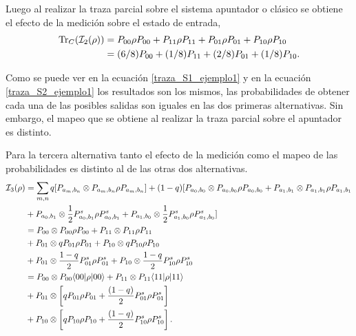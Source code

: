 Luego al realizar la traza parcial sobre el sistema apuntador  o clásico se obtiene el efecto de la medición sobre el estado de entrada,
\begin{equation}\label{traza_A2_ejemplo1}
    \begin{split}
        {\rm Tr}_C(\mathcal{I}_2(\rho)) &= P_{00} \rho P_{00} + P_{11}\rho P_{11}+ P_{01}\rho P_{01}+ P_{10}\rho P_{10}\\
        &=(6/8)P_{00} + (1/8)P_{11}+(2/8)P_{01} + (1/8)P_{10}.\\
    \end{split}
\end{equation}

Como se puede ver en la ecuación {\ref{traza_S1_ejemplo1}} y en la ecuación {\ref{traza_S2_ejemplo1}} los resultados son los mismos, las probabilidades de obtener cada una de las posibles salidas son iguales en las dos primeras alternativas. Sin embargo, el mapeo que se obtiene al realizar la traza parcial sobre el apuntador es distinto. 


Para la tercera alternativa tanto el efecto de la medición como el mapeo de las probabilidades es distinto al de las otras dos alternativas.%
\begin{equation}\label{tercera_alternativa_ejemplo1}
    \begin{split}
        \mathcal{I}_3(\rho)&=\sum_{m,n} q [P_{a_m,b_n}\otimes P_{a_m,b_n}\rho P_{a_m,b_n}]+(1-q)[P_{a_0,b_0}\otimes P_{a_0,b_0}\rho P_{a_0,b_0}+P_{a_1,b_1}\otimes P_{a_1,b_1} \rho P_{a_1,b_1}\\
        &+ P_{a_0,b_1} \otimes \frac{1}{2} P^{s}_{a_0,b_1}\rho P^s_{a_0,b_1}+ P_{a_1,b_0} \otimes \frac{1}{2} P^{s}_{a_1,b_0}\rho P^s_{a_1,b_0}]\\
        &=P_{00}\otimes P_{00}\rho P_{00} + P_{11}\otimes P_{11} \rho P_{11}\\
        &+P_{01} \otimes qP_{01}\rho P_{01} +P_{10}\otimes q P_{10}\rho P_{10} \\
        &+P_{01} \otimes \frac{1-q}{2}P^s_{01}\rho P^s_{01}+P_{10}\otimes \frac{1-q}{2}P^s_{10}\rho P^s_{10}\\
        &=P_{00}\otimes P_{00} \langle 00|\rho|00\rangle + P_{11}\otimes P_{11} \langle 11|\rho|11\rangle\\
        &+P_{01} \otimes \left[qP_{01}\rho P_{01}+ \frac{(1-q)}{2} P^s_{01}\rho P^s_{01}\right] \\
        &+P_{10}\otimes \left[qP_{10}\rho P_{10}+ \frac{(1-q)}{2} P^s_{10}\rho P^s_{10}\right].\\
    \end{split}
\end{equation}

